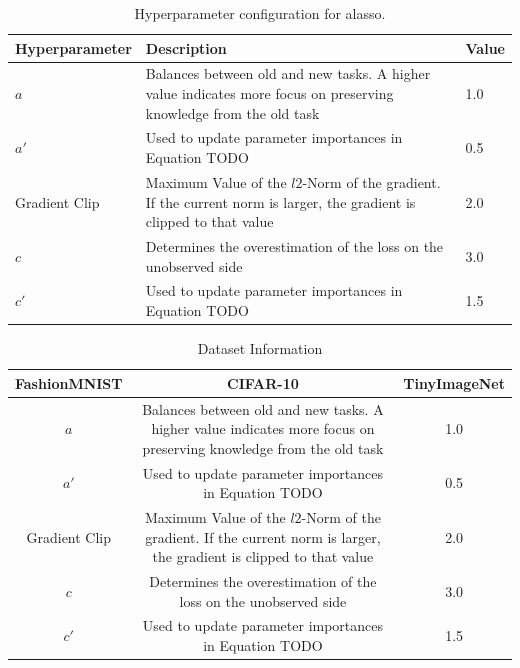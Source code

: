 \begin{table}[h!]
    \centering
    \begin{tabularx}{\textwidth}{X | X X } 
        \hline
        Hyperparameter & Description & Value \\ 
        \hline 
        $a$ & Balances between old and new tasks. A higher value indicates more focus
        on preserving knowledge from the old task & 1.0  \\ 
        $a'$ & Used to update parameter importances in Equation TODO & 0.5  \\
        Gradient Clip & Maximum Value of the $l2$-Norm of the gradient. If the current norm is larger, the
        gradient is clipped to that value & 2.0 \\ 
        $c$ & Determines the overestimation of the loss on the unobserved side & 3.0 \\
        $c'$ & Used to update parameter importances in Equation TODO & 1.5 \\
        \hline
    \end{tabularx}
    \caption{Hyperparameter configuration for \gls{alasso}.}
    \label{fig:AlassoParams}
\end{table}

\begin{table}[h!]
    \centering
    \begin{tabularx}{\textwidth}{c | c c } 
        \hline
         FashionMNIST & CIFAR-10 & TinyImageNet \\ 
        \hline 
        $a$ & Balances between old and new tasks. A higher value indicates more focus
        on preserving knowledge from the old task & 1.0  \\ 
        $a'$ & Used to update parameter importances in Equation TODO & 0.5  \\
        Gradient Clip & Maximum Value of the $l2$-Norm of the gradient. If the current norm is larger, the
        gradient is clipped to that value & 2.0 \\ 
        $c$ & Determines the overestimation of the loss on the unobserved side & 3.0 \\
        $c'$ & Used to update parameter importances in Equation TODO & 1.5 \\
        \hline
    \end{tabularx}
    \caption{Dataset Information}
    \label{fig:DatasetInformtion}
\end{table}

